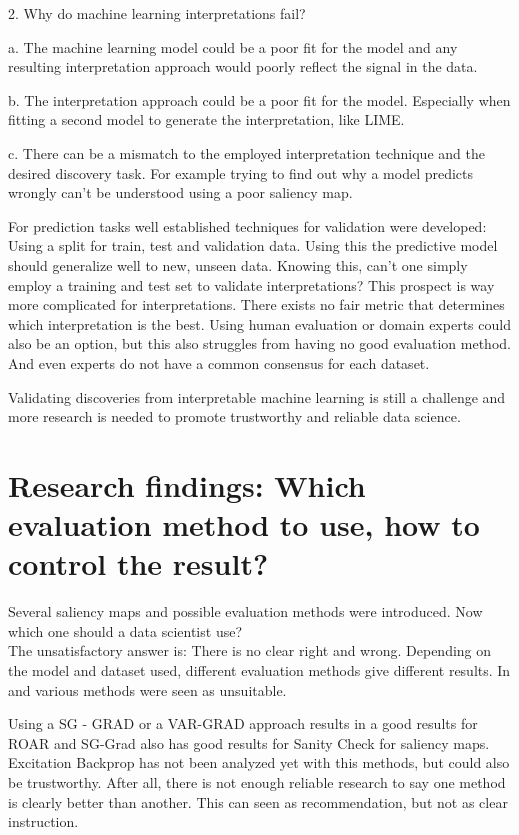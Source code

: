 2. Why do machine learning interpretations fail?

a. The machine learning model could be a poor fit for the model and any resulting interpretation approach would poorly reflect the signal in the data.

b. The interpretation approach could be a poor fit for the model. Especially when fitting a second model to generate the interpretation, like LIME.

c. There can be a mismatch to the employed interpretation technique and the desired discovery task. For example trying to find out why a model predicts wrongly can't be understood using a poor saliency  map.

For prediction tasks well established techniques for validation were developed: Using a split for train, test and validation data. Using this the predictive model should generalize well to new, unseen data. Knowing this, can't one simply employ a training and test set to validate interpretations? \cite{allen2023interpretable} This prospect is way more complicated for interpretations. There exists no fair metric that determines which interpretation is the best. Using human evaluation or domain experts could also be an option, but this also struggles from having no good evaluation method. And even experts do not have a common consensus for each dataset.

Validating discoveries from interpretable machine learning is still a challenge and more research is needed to promote trustworthy and reliable data science.

\section{Research findings: Which evaluation method to use, how to control the result?}

Several saliency maps and possible evaluation methods were introduced. Now which one should a data scientist use?
\\
The unsatisfactory answer is: There is no clear right and wrong. Depending on the model and dataset used, different evaluation methods give different results. In \cite{adebayo2020sanity} and \cite{hooker2019benchmark}  various methods were seen as unsuitable.

Using a SG - GRAD or a VAR-GRAD approach results in a good results for ROAR and  SG-Grad also has good results for Sanity Check for saliency maps. Excitation Backprop has not been analyzed yet with this methods, but could also be trustworthy. 
After all, there is not enough reliable research to say one method is clearly better than another. This can seen as recommendation, but not as clear instruction.

